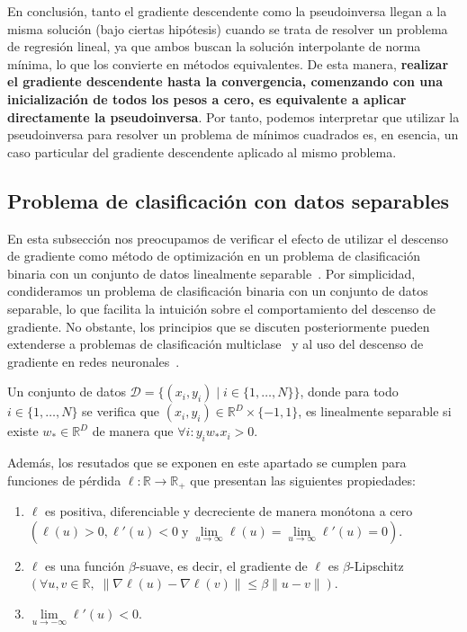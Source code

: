 En conclusión, tanto el gradiente descendente como la pseudoinversa llegan a la misma solución (bajo ciertas hipótesis) cuando se trata de resolver un problema de regresión lineal, ya que ambos buscan la solución interpolante de norma mínima, lo que los convierte en métodos equivalentes. De esta manera, \textbf{realizar el gradiente descendente hasta la convergencia, comenzando con una inicialización de todos los pesos a cero, es equivalente a aplicar directamente la pseudoinversa}. Por tanto, podemos interpretar que utilizar la pseudoinversa para resolver un problema de mínimos cuadrados es, en esencia, un caso particular del gradiente descendente aplicado al mismo problema.

\subsection{Problema de clasificación con datos separables}\label{subsec:problema-clasificación-separable}
En esta subsección nos preocupamos de verificar el efecto de utilizar el descenso de gradiente como método de optimización en un problema de clasificación binaria con un conjunto de datos linealmente separable~\cite{Soudry2024}. Por simplicidad, condideramos un problema de clasificación binaria con un conjunto de datos separable, lo que facilita la intuición sobre el comportamiento del descenso de gradiente. No obstante, los principios que se discuten posteriormente pueden extenderse a problemas de clasificación multiclase~\cite{Ravi2024} y al uso del descenso de gradiente en redes neuronales~\cite{Gunasekar2019}.

\begin{definicion}
    Un conjunto de datos $\mathcal{D} = \{ (x_i, y_i) \; | \; i \in \{1, \ldots, N \}\}$, donde para todo $i \in \{1, \ldots, N \}$ se verifica que $(x_i, y_i) \in \mathbb{R}^{D} \times \{-1, 1\}$, es linealmente separable si existe $w_{*} \in \mathbb{R}^{D}$ de manera que $\forall i : y_i w_{*} x_i > 0$.
\end{definicion}

Además, los resutados que se exponen en este apartado se cumplen para funciones de pérdida $\ell: \mathbb{R} \to \mathbb{R}_{+}$ que presentan las siguientes propiedades:
\begin{enumerate}
    \item\label{prop:positiva} $\ell$ es positiva, diferenciable y decreciente de manera monótona a cero $(\ell(u)>0, \ell'(u)<0 \; \text{y} \; \lim \limits_{u \to \infty} \ell(u) = \lim \limits_{u \to \infty} \ell'(u) = 0)$.
    \item\label{prop:smooth} $\ell$ es una función $\beta$-suave, es decir, el gradiente de $\ell$ es $\beta$-Lipschitz $(\forall u,v \in \mathbb{R}, \; \| \nabla \ell(u) - \nabla \ell(v) \| \leq \beta \| u-v \|)$.
    \item\label{prop:derivada_negativa} $\lim \limits_{u \to -\infty} \ell'(u) < 0$.
\end{enumerate}

